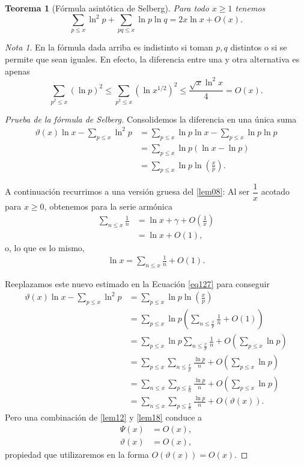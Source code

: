 \documentclass[10pt]{article}
\newtheorem{theorem}{Teorema}
\theoremstyle{definition}
\theoremstyle{remark}
\newtheorem*{note}{Nota}
\begin{document}
\begin{theorem}[F\'ormula asint\'otica de Selberg]
Para todo $x \geq 1$ tenemos
\[
\sum_{p \leq x} \ln^2 p + \sum_{pq \leq x} \ln p \ln q = 2x\ln x + O(x).
\]
\end{theorem}

\begin{note}
En la f\'ormula dada arriba es indistinto si toman $p,q$ distintos o si se permite que sean iguales. 
En efecto, la diferencia entre una y otra alternativa es apenas  
\[
\sum_{p^2 \le x} (\ln p)^2 \le \sum_{p^2 \le x} (\ln x^{1/2})^2 \le \frac{\sqrt{x} \ln^2 x}{4}= O(x).  
\]
\end{note}

\begin{proof}[Prueba de la f\'ormula de Selberg]
Consolidemos la diferencia en una \'unica suma 
\begin{align}
\vartheta(x)\ln x - \sum_{p \leq x} \ln^2 p &= \sum_{p \leq x} \ln p \ln x - \sum_{p \leq x} \ln p \ln p \\
&= \sum_{p \leq x} \ln p (\ln x - \ln p) \\
&= \sum_{p \leq x} \ln p \ln \left(\frac{x}{p}\right).\label{eq127}
\end{align}

A continuaci\'on recurrimos a una versi\'on gruesa del \cref{lem08}:
Al ser $\dfrac{1}{x}$ acotado para $x \ge 0$, obtenemos  para la serie arm\'onica 
\begin{align}
\sum_{n \leq x} \frac{1}{n} &= \ln x + \gamma + O\left(\frac{1}{x}\right) \\
&= \ln x + O(1),  
\end{align}
o, lo que es lo mismo, 
\begin{align}
\ln x = \sum_{n \leq x} \frac{1}{n} + O(1). 
\end{align}

Reeplazamos este nuevo estimado en la Ecuaci\'on \ref{eq127} para conseguir 
\begin{align}
\vartheta(x)\ln x - \sum_{p \leq x} \ln^2 p &= \sum_{p \leq x} \ln p \ln \left(\frac{x}{p}\right) \\
&= \sum_{p \leq x} \ln p \left(\sum_{n \leq \frac{x}{p}} \frac{1}{n} + O(1)\right) \\
&= \sum_{p \leq x} \ln p \sum_{n \leq \frac{x}{p}} \frac{1}{n} + O\left(\sum_{p \leq x} \ln p\right) \\
&= \sum_{p \leq x} \sum_{n \leq \frac{x}{p}} \frac{\ln p}{n} + O\left(\sum_{p \leq x} \ln p\right) \\
&= \sum_{n \leq x} \sum_{p \leq \frac{x}{n}} \frac{\ln p}{n} + O\left(\sum_{p \leq x} \ln p\right) \\
&= \sum_{n \leq x} \sum_{p \leq \frac{x}{n}} \frac{\ln p}{n} + O(\vartheta(x)).\label{eq136}
\end{align}
Pero una combinaci\'on de \cref{lem12} y \cref{lem18} conduce a 
\begin{align}
\Psi(x) &= O(x),  \\
\vartheta(x) &= O(x),
\end{align}
propiedad que utilizaremos en la forma $O(\vartheta(x))=O(x)$.


\end{proof}
\end{document}
